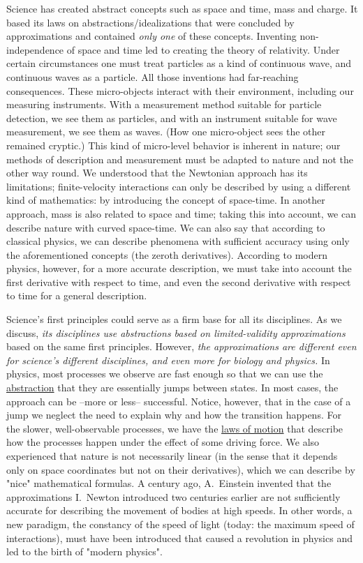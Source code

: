 Science has created abstract concepts such as space and time, mass and charge.
It based its laws on abstractions/idealizations that were concluded by approximations and contained \textit{only one} of these concepts. 
Inventing non-independence of space and time led to creating the theory of relativity.
Under certain circumstances one must treat particles as a kind of continuous wave, and continuous waves as a particle.
All those inventions had far-reaching consequences.
These micro-objects interact with their environment, including our measuring instruments.
With a measurement method suitable for particle detection, we see them as particles, and with an instrument suitable for wave measurement, we see them as waves.
(How one micro-object sees the other remained cryptic.)
This kind of micro-level behavior is inherent in nature; our methods of description and measurement must be adapted to nature and not the other way round.
We understood that the Newtonian approach has its limitations; finite-velocity interactions can only be described by using a different kind of mathematics: by introducing the concept of space-time.
In another approach, mass is also related to space and time; taking this into account, we can describe nature with curved space-time.
We can also say that according to classical physics, we can describe phenomena with sufficient accuracy using only the aforementioned concepts (the zeroth derivatives).
According to modern physics, however, for a more accurate description, we must take into account the first derivative with respect to time, 
and even the second derivative with respect to time for a general description.


 Science's first principles could serve as a firm base for all its disciplines.
As we discuss, \textit{its disciplines use abstractions based on limited-validity approximations} based on the same first principles.
However, \textit{the approximations are different even for 
science's different disciplines, and even more for biology and physics.}
In physics, most processes we observe are fast enough so that we can use the \hyperlink{Abstractions}
{abstraction} that they are essentially jumps between states.
In most cases, the approach can be --more or less-- successful. Notice, however, that in the case of a jump
we neglect the need to explain why and how the transition happens.
For the slower, well-observable processes,
we have the \hyperlink{PhysicsLawsOfMotion}
{laws of motion}
that describe how the processes happen under the effect of some driving force.
We also experienced that nature is not necessarily linear (in the sense that it depends only on space coordinates but not on their derivatives), which we can describe by "nice" mathematical formulas.
A century ago, A.~Einstein invented that the approximations I.~Newton introduced two centuries earlier are not sufficiently accurate for describing the movement of bodies at high speeds. In other words, a new paradigm, the constancy of the speed of light (today: the maximum speed
of interactions), must have been introduced
that caused a revolution in physics and led to the birth of "modern physics". 
%
 
